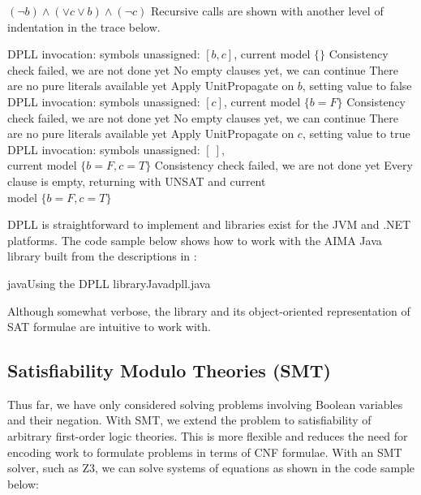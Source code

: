 \documentclass[a4paper,openany,12pt]{book}
\begin{document}
\begin{example}{$(\neg b) \land (\lor c \lor b) \land (\neg c)$}
    Recursive calls are shown with another level of indentation in the trace below.
    \begin{outline}
        \1[\cogs] DPLL invocation: symbols unassigned: $[b, c]$, current model $\{\}$
        \1[\arrow] Consistency check failed, we are not done yet
        \1[\arrow] No empty clauses yet, we can continue
        \1[\arrow] There are no pure literals available yet
        \1[\arrow] Apply UnitPropagate on $b$, setting value to false
        \2[\cogs] DPLL invocation: symbols unassigned: $[c]$, current model $\{b=F\}$
        \2[\arrow] Consistency check failed, we are not done yet
        \2[\arrow] No empty clauses yet, we can continue
        \2[\arrow] There are no pure literals available yet
        \2[\arrow] Apply UnitPropagate on $c$, setting value to true
        \3[\cogs] DPLL invocation: symbols unassigned: $[~]$,\\ current model $\{b=F, c=T\}$
        \3[\arrow] Consistency check failed, we are not done yet
        \3[\crossMark] Every clause is empty, returning with \textsc{UNSAT} and current\\model $\{b=F, c=T\}$
    \end{outline}
\end{example}

DPLL is straightforward to implement and libraries exist for the JVM and .NET platforms.
The code sample below shows how to work with the AIMA Java library built from the descriptions in
\citet{russell2016artificial}:

\begin{mycodefile}{java}{\label{code:java:aima:1}Using the DPLL library}{Java}{dpll.java}
\end{mycodefile}

Although somewhat verbose, the library and its object-oriented representation of SAT formulae are intuitive to work with.

\subsection{Satisfiability Modulo Theories (SMT)}

Thus far, we have only considered solving problems involving Boolean variables and their negation.
With SMT, we extend the problem to satisfiability of arbitrary first-order logic theories.
This is more flexible and reduces the need for encoding work to formulate problems in terms of CNF formulae.
With an SMT solver, such as Z3, we can solve systems of equations as shown in the code sample below:
\end{document}
